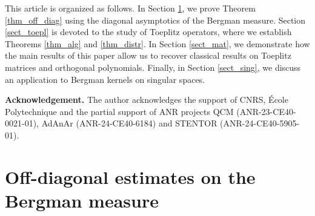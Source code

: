\documentclass[12pt]{article}
\numberwithin{equation}{section}
\theoremstyle{theorem}
\theoremstyle{definition}
\theoremstyle{remark}
\begin{document}
	\par 
	This article is organized as follows.  
	In Section \ref{sect_off_diag}, we prove Theorem \ref{thm_off_diag} using the diagonal asymptotics of the Bergman measure.  
	Section \ref{sect_toepl} is devoted to the study of Toeplitz operators, where we establish Theorems \ref{thm_alg} and \ref{thm_distr}.  
	In Section \ref{sect_mat}, we demonstrate how the main results of this paper allow us to recover classical results on Toeplitz matrices and orthogonal polynomials.
	Finally, in Section \ref{sect_sing}, we discuss an application to Bergman kernels on singular spaces.
	\par
	\textbf{Acknowledgement.}
	The author acknowledges the support of CNRS, École Polytechnique and the partial support of ANR projects QCM (ANR-23-CE40-0021-01), AdAnAr (ANR-24-CE40-6184) and STENTOR (ANR-24-CE40-5905-01).
	

	\section{Off-diagonal estimates on the Bergman measure}\label{sect_off_diag}
	
\end{document}
